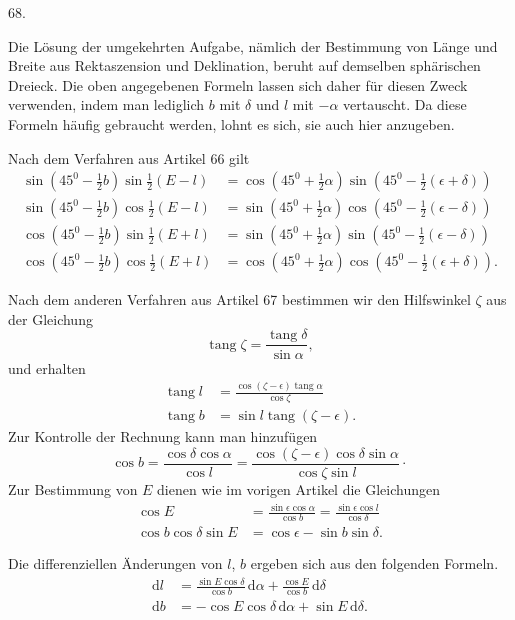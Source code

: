 \par{}\medskip
\hypertarget{native-087-article068}{}
\begin{center}68.\end{center}
Die Lösung der umgekehrten Aufgabe, nämlich der Bestimmung von Länge und Breite aus Rektaszension und Deklination, beruht auf demselben sphärischen Dreieck. Die oben angegebenen Formeln lassen sich daher für diesen Zweck verwenden, indem man lediglich $b$ mit $\delta$ und $l$ mit $-\alpha$ vertauscht. Da diese Formeln häufig gebraucht werden, lohnt es sich, sie auch hier anzugeben.

Nach dem Verfahren aus Artikel 66 gilt
\[
\begin{aligned}
\sin(45^0-\tfrac12 b)\sin\tfrac12(E-l)&=\cos(45^0+\tfrac12\alpha)\sin(45^0-\tfrac12(\epsilon+\delta))\\[.5em]
\sin(45^0-\tfrac12 b)\cos\tfrac12(E-l)&=\sin(45^0+\tfrac12\alpha)\cos(45^0-\tfrac12(\epsilon-\delta))\\[.5em]
\cos(45^0-\tfrac12 b)\sin\tfrac12(E+l)&=\sin(45^0+\tfrac12\alpha)\sin(45^0-\tfrac12(\epsilon-\delta))\\[.5em]
\cos(45^0-\tfrac12 b)\cos\tfrac12(E+l)&=\cos(45^0+\tfrac12\alpha)\cos(45^0-\tfrac12(\epsilon+\delta)).
\end{aligned}
\]

Nach dem anderen Verfahren aus Artikel 67 bestimmen wir den Hilfswinkel $\zeta$ aus der Gleichung
\[
\operatorname{tang}\zeta=\frac{\operatorname{tang}\delta}{\sin\alpha},
\]
\noindent und erhalten
\[
\begin{aligned}
\operatorname{tang}l&=\frac{\cos(\zeta-\epsilon)\operatorname{tang}\alpha}{\cos\zeta}\\[.5em]
\operatorname{tang}b&=\sin l\operatorname{tang}(\zeta-\epsilon).
\end{aligned}
\]
\noindent Zur Kontrolle der Rechnung kann man hinzufügen
\[
\cos b=\frac{\cos\delta\cos\alpha}{\cos l}=\frac{\cos(\zeta-\epsilon)\cos\delta\sin\alpha}{\cos\zeta\sin l}\cdot
\]
\noindent Zur Bestimmung von $E$ dienen wie im vorigen Artikel die Gleichungen
\[
\begin{aligned}
\cos E&=\frac{\sin\epsilon\cos\alpha}{\cos b}=\frac{\sin\epsilon\cos l}{\cos\delta}\\[.5em]
\cos b\cos\delta\sin E&=\cos\epsilon-\sin b\sin\delta.
\end{aligned}
\]

Die differenziellen Änderungen von $l$, $b$ ergeben sich aus den folgenden Formeln.
\[
\begin{aligned}
\mathrm{d}l&=\frac{\sin E\cos\delta}{\cos b}\,\mathrm{d}\alpha+\frac{\cos E}{\cos b}\,\mathrm{d}\delta\\[.5em]
\mathrm{d}b&=-\cos E\cos\delta\,\mathrm{d}\alpha+\sin E\,\mathrm{d}\delta.
\end{aligned}
\]
